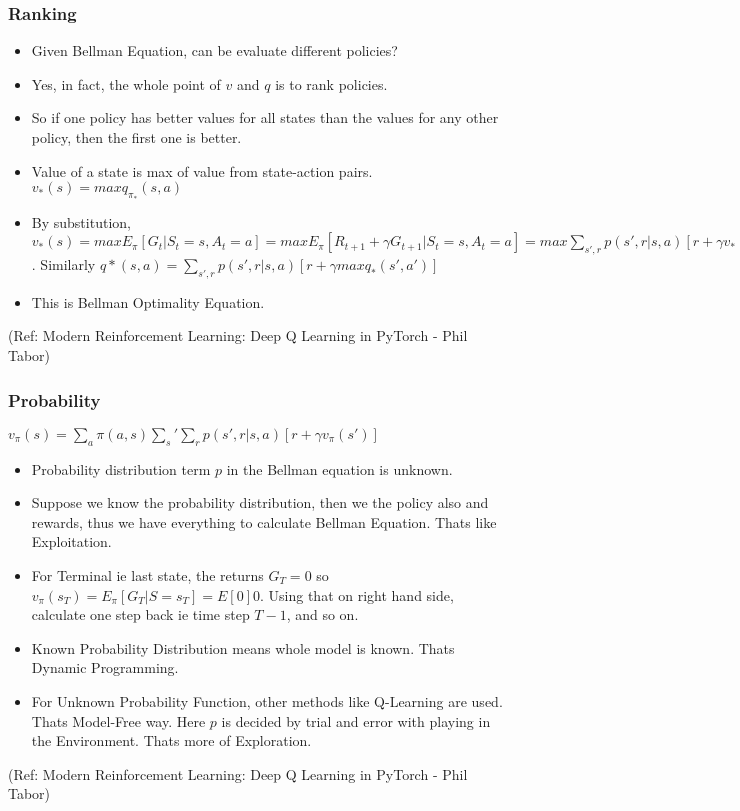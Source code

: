 \begin{frame}[fragile]\frametitle{Ranking}


\begin{itemize}
\item Given Bellman Equation, can be evaluate different policies?
\item Yes, in fact, the whole point of $v$ and $q$ is to rank policies.
\item So if one policy has better values for all states than the values for any other policy, then the first one is better.
\item Value of a state is max of value from state-action pairs. $v_*(s) = max q_{\pi_*}(s,a)$
\item By substitution, $v_*(s) = max E_{\pi}[G_t|S_t=s, A_t=a] = max E_{\pi}[R_{t+1}+ \gamma G_{t+1}|S_t=s, A_t=a] = max \sum_{s',r} p (s',r|s,a)[r + \gamma v_*(s')]$. Similarly $q*(s,a) = \sum_{s',r} p (s',r|s,a)[r + \gamma max q_*(s',a')]$
\item This is Bellman Optimality Equation.
\end{itemize}

{\tiny (Ref: Modern Reinforcement Learning: Deep Q Learning in PyTorch - Phil Tabor)}

\end{frame}

\begin{frame}[fragile]\frametitle{Probability}

$v_{\pi}(s) = \sum_a \pi(a,s) \sum_s' \sum_r p(s',r|s,a) [r + \gamma v_{\pi}(s')]$

\begin{itemize}
\item Probability distribution term $p$ in the Bellman equation is unknown.
\item Suppose we know the probability distribution, then we the policy also and rewards, thus we have everything to calculate Bellman Equation. Thats like Exploitation.
\item For Terminal ie last state, the returns $G_T = 0$ so $v_{\pi}(s_T) = E_{\pi}[G_T|S=s_T] =E[0] 0$. Using that on right hand side, calculate one step back ie time step $T-1$, and so on.
\item Known Probability Distribution means whole model is known. Thats Dynamic Programming.
\item For Unknown Probability Function, other methods like Q-Learning are used. Thats Model-Free way. Here $p$ is decided by trial and error with playing in the Environment. Thats more of Exploration.
\end{itemize}

{\tiny (Ref: Modern Reinforcement Learning: Deep Q Learning in PyTorch - Phil Tabor)}

\end{frame}

